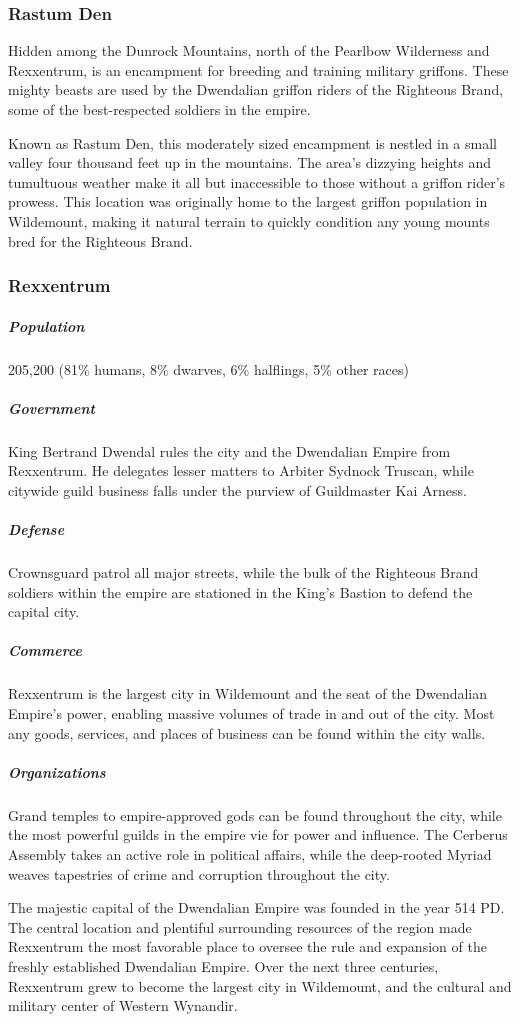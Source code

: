 \documentclass[10pt,a4paper,twoside,bg=print,twocolumn,openany,nodeprecatedcode]{dndbook}
\begin{document}
\subsubsection{Rastum Den}
Hidden among the Dunrock Mountains, north of the Pearlbow Wilderness and Rexxentrum, is an encampment for breeding and training military griffons. These mighty beasts are used by the Dwendalian griffon riders of the Righteous Brand, some of the best-respected soldiers in the empire.

Known as Rastum Den, this moderately sized encampment is nestled in a small valley four thousand feet up in the mountains. The area's dizzying heights and tumultuous weather make it all but inaccessible to those without a griffon rider's prowess. This location was originally home to the largest griffon population in Wildemount, making it natural terrain to quickly condition any young mounts bred for the Righteous Brand.

\subsubsection{Rexxentrum}
\subparagraph{Population}
205,200 (81\% humans, 8\% dwarves, 6\% halflings, 5\% other races)

\subparagraph{Government}
King Bertrand Dwendal rules the city and the Dwendalian Empire from Rexxentrum. He delegates lesser matters to Arbiter Sydnock Truscan, while citywide guild business falls under the purview of Guildmaster Kai Arness.

\subparagraph{Defense}
Crownsguard patrol all major streets, while the bulk of the Righteous Brand soldiers within the empire are stationed in the King's Bastion to defend the capital city.

\subparagraph{Commerce}
Rexxentrum is the largest city in Wildemount and the seat of the Dwendalian Empire's power, enabling massive volumes of trade in and out of the city. Most any goods, services, and places of business can be found within the city walls.

\subparagraph{Organizations}
Grand temples to empire-approved gods can be found throughout the city, while the most powerful guilds in the empire vie for power and influence. The Cerberus Assembly takes an active role in political affairs, while the deep-rooted Myriad weaves tapestries of crime and corruption throughout the city.

The majestic capital of the Dwendalian Empire was founded in the year 514 PD. The central location and plentiful surrounding resources of the region made Rexxentrum the most favorable place to oversee the rule and expansion of the freshly established Dwendalian Empire. Over the next three centuries, Rexxentrum grew to become the largest city in Wildemount, and the cultural and military center of Western Wynandir.
\end{document}
